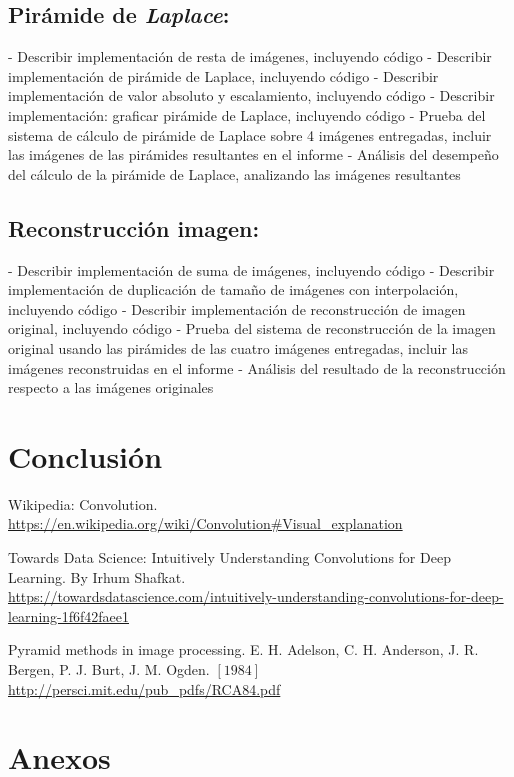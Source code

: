 \subsection{Pirámide de \textit{Laplace}:}
- Describir implementación de resta de imágenes, incluyendo código
- Describir implementación de pirámide de Laplace, incluyendo código
- Describir implementación de valor absoluto y escalamiento, incluyendo código
- Describir implementación: graficar pirámide de Laplace, incluyendo código
- Prueba del sistema de cálculo de pirámide de Laplace sobre 4 imágenes entregadas, incluir las
imágenes de las pirámides resultantes en el informe
- Análisis del desempeño del cálculo de la pirámide de Laplace, analizando las imágenes resultantes


\subsection{Reconstrucción imagen:}
- Describir implementación de suma de imágenes, incluyendo código
- Describir implementación de duplicación de tamaño de imágenes con interpolación, incluyendo
código
- Describir implementación de reconstrucción de imagen original, incluyendo código
- Prueba del sistema de reconstrucción de la imagen original usando las pirámides de las cuatro
imágenes entregadas, incluir las imágenes reconstruidas en el informe
- Análisis del resultado de la reconstrucción respecto a las imágenes originales


\section{Conclusión}


\newpage
\begin{thebibliography}{X}
     Wikipedia: Convolution. \\
    \url{https://en.wikipedia.org/wiki/Convolution#Visual_explanation} 

     Towards Data Science: Intuitively Understanding Convolutions for Deep Learning. By Irhum Shafkat. \\
    \url{https://towardsdatascience.com/intuitively-understanding-convolutions-for-deep-learning-1f6f42faee1} 

     Pyramid methods in image processing. E. H. Adelson, C. H. Anderson,  J. R. Bergen,  P. J. Burt,  J. M. Ogden. $[1984]$
    \url{http://persci.mit.edu/pub_pdfs/RCA84.pdf}

\end{thebibliography}

\section{Anexos}
